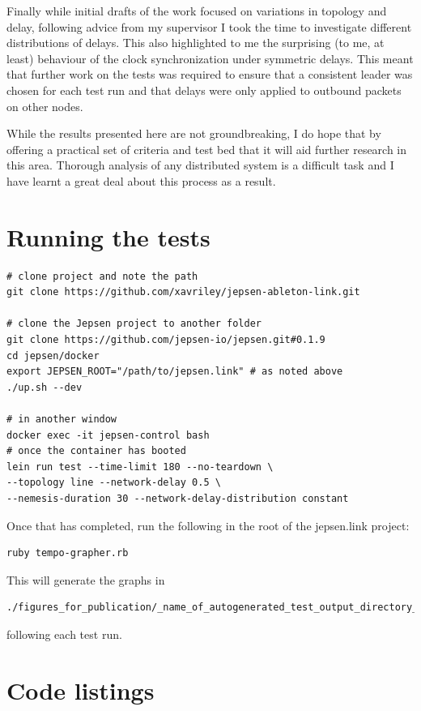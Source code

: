 \documentclass[11pt]{article} %
\theoremstyle{plain}
\theoremstyle{definition}
\begin{document}
Finally while initial drafts of the work focused on variations in topology and
delay, following advice from my supervisor I took the time to investigate
different distributions of delays. This also highlighted to me the surprising
(to me, at least) behaviour of the clock synchronization under symmetric
delays. This meant that further work on the tests was required to ensure that a
consistent leader was chosen for each test run and that delays were only
applied to outbound packets on other nodes.

While the results presented here are not groundbreaking, I do hope that by
offering a practical set of criteria and test bed that it will aid further
research in this area. Thorough analysis of any distributed system is a
difficult task and I have learnt a great deal about this process as a result.

\section{Running the tests}

\begin{verbatim}
# clone project and note the path
git clone https://github.com/xavriley/jepsen-ableton-link.git

# clone the Jepsen project to another folder
git clone https://github.com/jepsen-io/jepsen.git#0.1.9
cd jepsen/docker
export JEPSEN_ROOT="/path/to/jepsen.link" # as noted above
./up.sh --dev

# in another window
docker exec -it jepsen-control bash
# once the container has booted
lein run test --time-limit 180 --no-teardown \
--topology line --network-delay 0.5 \
--nemesis-duration 30 --network-delay-distribution constant
\end{verbatim}

Once that has completed, run the following in the root of the jepsen.link
project:

\begin{verbatim}
ruby tempo-grapher.rb
\end{verbatim}

This will generate the graphs in

\begin{verbatim}
./figures_for_publication/_name_of_autogenerated_test_output_directory_/plot.pdf
\end{verbatim}

following each test run.

\section{Code listings}
\end{document}

